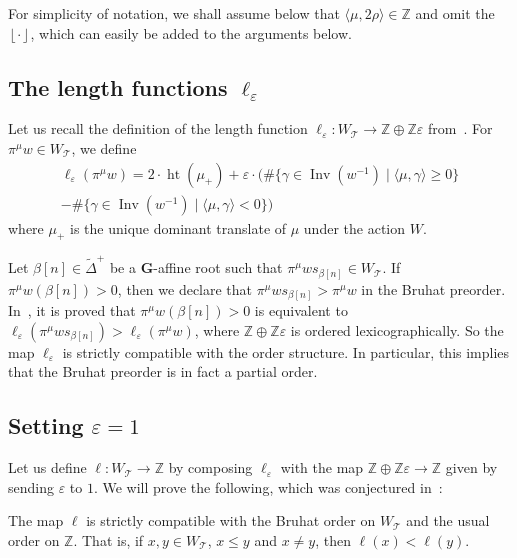 \documentclass[ALCO,ThmDefs,Unicode]{cedram}
\DeclareMathOperator{\height}{ht}
\DeclareMathOperator{\Inv}{Inv}
\newcommand{\floor}[1]{\left\lfloor #1 \right\rfloor}
\newcommand{\bG}{\mathbf{G}}
\newcommand{\cT}{\mathcal{T}}
\newcommand{\ZZ}{\mathbb{Z}}
\newcommand{\eps}{\varepsilon}
\newcommand{\suchthat}{\mid}
\newcommand{\WTits}{W_{\TitsCone}}
\newcommand{\TitsCone}{\cT}
\newcommand{\tDelta}{\widetilde{\Delta}}
\begin{document}
For simplicity of notation, we shall assume below that $\langle \mu, 2\rho\rangle \in \ZZ$ and omit the $\floor{\cdot}$, which can easily be added to the arguments below.

\subsection{The length functions \texorpdfstring{$\ell_\eps$}{ell eps}}\label{sec:length-functions-and-the-conjecture}

Let us recall the definition of the length function $\ell_\varepsilon : \WTits \rightarrow \ZZ \oplus \ZZ \varepsilon$ from~\cite{M}. For $\pi^\mu w \in \WTits$, we define
\begin{multline}
\ell_\varepsilon (\pi^\mu w) = 2 \cdot \height(\mu_+) + \varepsilon \cdot \big(\# \{ \gamma \in \Inv(w^{-1}) \suchthat \langle \mu,\gamma \rangle \geq 0 \}
\\ 
- \# \{ \gamma \in \Inv(w^{-1}) \suchthat \langle \mu,\gamma \rangle < 0 \} \big)
\end{multline}
where $\mu_+$ is the unique dominant translate of $\mu$ under the action $W$.

Let $\beta[n]\in\tDelta^+$ be a $\bG$-affine root such that $\pi^\mu w s_{\beta[n]} \in \WTits$. If $\pi^\mu w(\beta[n]) > 0$, then we declare that $\pi^\mu w s_{\beta[n]} > \pi^\mu w$ in the Bruhat preorder. In~\cite{M}, it is proved that $\pi^\mu w(\beta[n]) > 0$ is equivalent to $\ell_\varepsilon(\pi^\mu w s_{\beta[n]}) > \ell_\varepsilon(\pi^\mu w) $, where $\ZZ \oplus \ZZ \varepsilon$ is ordered lexicographically. So the map $\ell_\varepsilon$ is strictly compatible with the order structure. In particular, this implies that the Bruhat preorder is in fact a partial order.

\subsection{Setting \texorpdfstring{$\varepsilon = 1$}{varepsilon = 1}}

Let us define $\ell : \WTits \rightarrow \ZZ$ by composing $\ell_\varepsilon$ with the map $\ZZ \oplus \ZZ \varepsilon \rightarrow \ZZ$ given by sending $\varepsilon$ to $1$. We will prove the following, which was conjectured in~\cite{M}:

\begin{theo}\label{thm:compatibility-of-ell-with-order}
The map $\ell$ is strictly compatible with the Bruhat order on $\WTits$ and the usual order on $\ZZ$. That is, if $x,y \in \WTits$, $x \leq y$ and $x \neq y$, then $\ell(x) < \ell(y)$.
\end{theo}
\end{document}

